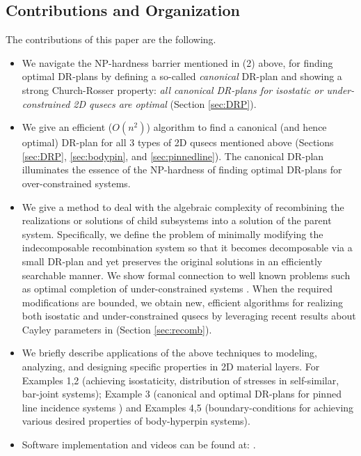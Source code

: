 \subsection{Contributions and Organization}
\label{sec:cont}

The contributions of this paper are the following.
\begin{itemize}
  \item We navigate the NP-hardness barrier mentioned in (2) above,
  for finding optimal DR-plans by defining a so-called \textit{canonical}
  DR-plan and showing a strong Church-Rosser property: \textit{all
  canonical DR-plans for isostatic or under-constrained 2D qusecs are
  optimal} (Section \ref{sec:DRP}).

  \item We give an efficient ($O(n^2)$) algorithm to find a canonical
  (and hence optimal) DR-plan for all 3 types of 2D qusecs mentioned
  above (Sections \ref{sec:DRP}, \ref{sec:bodypin}, and
  \ref{sec:pinnedline}). The canonical DR-plan illuminates the essence
  of the NP-hardness of finding optimal DR-plans for over-constrained
  systems.

  \item We give a method to deal with the algebraic complexity of
  recombining the realizations or solutions of child subsystems into a
  solution of the parent system. Specifically, we define the problem
  of minimally modifying the indecomposable recombination system so
  that it becomes decomposable via a small DR-plan and yet preserves
  the original solutions in an efficiently searchable manner. We show
  formal connection to well known problems such as optimal completion
  of under-constrained systems \cite{XX}. When the required
  modifications are bounded, we obtain new, efficient algorithms for
  realizing both isostatic and under-constrained qusecs by leveraging
  recent results about Cayley parameters in \cite{XX,XX} (Section
  \ref{sec:recomb}).

  \item We briefly describe applications of the above techniques to
  modeling, analyzing, and designing specific properties in 2D material
  layers. For Examples 1,2 (achieving isostaticity, distribution of
  stresses in self-similar, bar-joint systems); Example 3 (canonical
  and optimal DR-plans for pinned line incidence systems \cite{XX})
  and Examples 4,5 (boundary-conditions for achieving various desired
  properties of body-hyperpin systems).

  \item Software implementation and videos can be found at:
  .
\end{itemize}
